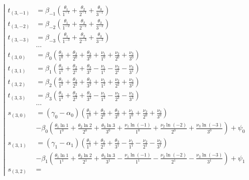 \begin{equation*} \left| \begin{aligned}
t_{(3,-1)} &=
  \beta_{-1}
  \left(
  \frac{\theta_1}{1^{-1}}
+ \frac{\theta_2}{2^{-1}}
+ \frac{\theta_3}{3^{-1}}
  \right) \\
%
t_{(3,-2)} &=
  \beta_{-2}
  \left(
  \frac{\theta_1}{1^{-2}}
+ \frac{\theta_2}{2^{-2}}
+ \frac{\theta_3}{3^{-2}}
  \right) \\
%
t_{(3,-3)} &=
  \beta_{-3}
  \left(
  \frac{\theta_1}{1^{-3}}
+ \frac{\theta_2}{2^{-3}}
+ \frac{\theta_3}{3^{-3}}
  \right) \\
%
&\ldots \\
%
t_{(3,0)} &=
  \beta_0
  \left(
  \frac{\theta_1}{1^0}
+ \frac{\theta_2}{2^0}
+ \frac{\theta_3}{3^0}
+ \frac{\nu_1}{1^0}
+ \frac{\nu_2}{2^0}
+ \frac{\nu_3}{3^0}
  \right) \\
%
t_{(3,1)} &=
  \beta_1
  \left(
  \frac{\theta_1}{1^1}
+ \frac{\theta_2}{2^1}
+ \frac{\theta_3}{3^1}
- \frac{\nu_1}{1^1}
- \frac{\nu_2}{2^1}
- \frac{\nu_3}{3^1}
  \right) \\
%
t_{(3,2)} &=
  \beta_2
  \left(
  \frac{\theta_1}{1^2}
+ \frac{\theta_2}{2^2}
+ \frac{\theta_3}{3^2}
+ \frac{\nu_1}{1^2}
+ \frac{\nu_2}{2^2}
+ \frac{\nu_3}{3^2}
  \right) \\
%
t_{(3,3)} &=
  \beta_3
  \left(
  \frac{\theta_1}{1^3}
+ \frac{\theta_2}{2^3}
+ \frac{\theta_3}{3^3}
- \frac{\nu_1}{1^3}
- \frac{\nu_2}{2^3}
- \frac{\nu_3}{3^3}
  \right) \\
%
&\ldots \\
%
s_{(3,0)} &=
  (\gamma_0 - \alpha_0)
  \left(
  \frac{\theta_1}{1^0}
+ \frac{\theta_2}{2^0}
+ \frac{\theta_3}{3^0}
+ \frac{\nu_1}{1^0}
+ \frac{\nu_2}{2^0}
+ \frac{\nu_3}{3^0}
  \right) \\ &
- \beta_0
  \left(
  \frac{\theta_1 \ln{1}}{1^0}
+ \frac{\theta_2 \ln{2}}{2^0}
+ \frac{\theta_3 \ln{3}}{3^0}
+ \frac{\nu_1 \ln{(- 1)}}{1^0}
+ \frac{\nu_2 \ln{(- 2)}}{2^0}
+ \frac{\nu_3 \ln{(- 3)}}{3^0}
  \right)
+ \psi_0 \\
%
s_{(3,1)} &=
  (\gamma_1 - \alpha_1)
  \left(
  \frac{\theta_1}{1^1}
+ \frac{\theta_2}{2^1}
+ \frac{\theta_3}{3^1}
- \frac{\nu_1}{1^1}
- \frac{\nu_2}{2^1}
- \frac{\nu_3}{3^1}
  \right) \\ &
- \beta_1
  \left(
  \frac{\theta_1 \ln{1}}{1^1}
+ \frac{\theta_2 \ln{2}}{2^1}
+ \frac{\theta_3 \ln{3}}{3^1}
- \frac{\nu_1 \ln{(- 1)}}{1^1}
- \frac{\nu_2 \ln{(- 2)}}{2^1}
- \frac{\nu_3 \ln{(- 3)}}{3^1}
  \right)
+ \psi_1 \\
%
s_{(3,2)} &=

\end{aligned}
\end{equation*}
